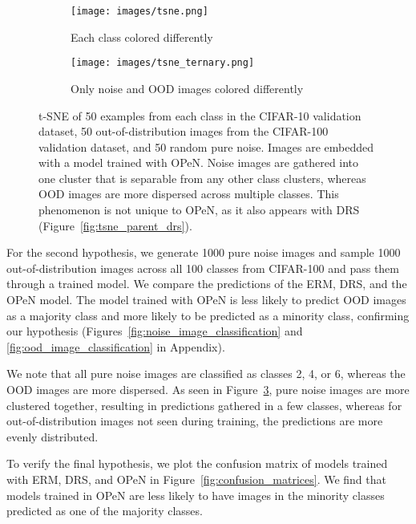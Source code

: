 \begin{figure}[!ht]
    \centering
    \begin{subfigure}[b]{0.49\textwidth}
        \centering
        \texttt{[image: images/tsne.png]}
        \caption{Each class colored differently}
        \label{fig:tsne_open}
    \end{subfigure}
    \hfill
    \begin{subfigure}[b]{0.49\textwidth}
        \centering
        \texttt{[image: images/tsne\_ternary.png]}
        \caption{Only noise and OOD images colored differently}
        \label{fig:tsne_ternary_open}
    \end{subfigure}
    \caption{t-SNE of 50 examples from each class in the CIFAR-10 validation dataset, 50 out-of-distribution images from the CIFAR-100 validation dataset, and 50 random pure noise. Images are embedded with a model trained with OPeN. Noise images are gathered into one cluster that is separable from any other class clusters, whereas OOD images are more dispersed across multiple classes. This phenomenon is not unique to OPeN, as it also appears with DRS (Figure~\ref{fig:tsne_parent_drs}).}
    \label{fig:tsne_parent}
\end{figure}    


For the second hypothesis, we generate 1000 pure noise images and sample 1000 out-of-distribution images across all 100 classes from CIFAR-100 and pass them through a trained model. We compare the predictions of the ERM, DRS, and the OPeN model. The model trained with OPeN is less likely to predict OOD images as a majority class and more likely to be predicted as a minority class, confirming our hypothesis (Figures~\ref{fig:noise_image_classification} and \ref{fig:ood_image_classification} in Appendix).

We note that all pure noise images are classified as classes 2, 4, or 6, whereas the OOD images are more dispersed. As seen in Figure~\ref{fig:tsne_parent}, pure noise images are more clustered together, resulting in predictions gathered in a few classes, whereas for out-of-distribution images not seen during training, the predictions are more evenly distributed.

To verify the final hypothesis, we plot the confusion matrix of models trained with ERM, DRS, and OPeN in Figure~\ref{fig:confusion_matrices}. We find that models trained in OPeN are less likely to have images in the minority classes predicted as one of the majority classes.

